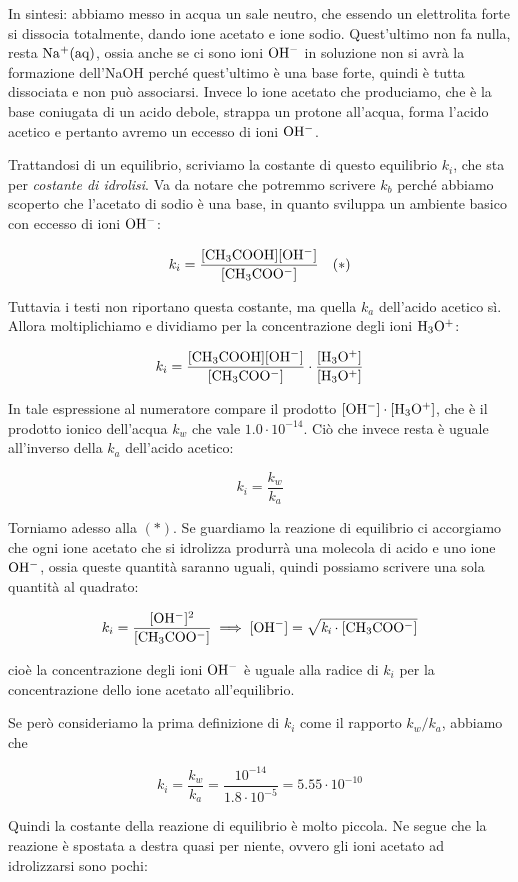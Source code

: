 In sintesi: abbiamo messo in acqua un sale neutro, che essendo un elettrolita forte si dissocia totalmente, dando ione acetato e ione sodio. Quest'ultimo non fa nulla, resta $\rm Na^+(aq)$, ossia anche se ci sono ioni $\rm OH^-$ in soluzione non si avrà la formazione dell'NaOH perché quest'ultimo è una base forte, quindi è tutta dissociata e non può associarsi. Invece lo ione acetato che produciamo, che è la base coniugata di un acido debole, strappa un protone all'acqua, forma l'acido acetico e pertanto avremo un eccesso di ioni $\rm OH^-$.

Trattandosi di un equilibrio, scriviamo la costante di questo equilibrio $k_i$, che sta per \textit{costante di idrolisi}. Va da notare che potremmo scrivere $k_b$ perché abbiamo scoperto che l'acetato di sodio è una base, in quanto sviluppa un ambiente basico con eccesso di ioni $\rm OH^-$:

$$k_i = \rm{\frac{[CH_3COOH] [OH^-]}{[CH_3COO^-]}} \quad (*)$$

Tuttavia i testi non riportano questa costante, ma quella $k_a$ dell'acido acetico sì. Allora moltiplichiamo e dividiamo per la concentrazione degli ioni $\rm H_3O^+$:

$$k_i = \rm{\frac{[CH_3COOH] [OH^-]}{[CH_3COO^-]} \cdot \frac{[H_3O^+]}{[H_3O^+]}}$$

In tale espressione al numeratore compare il prodotto $\rm [OH^-] \cdot [H_3O^+]$, che è il prodotto ionico dell'acqua $k_w$ che vale $1.0 \cdot 10^{-14}$. Ciò che invece resta è uguale all'inverso della $k_a$ dell'acido acetico:

$$k_i = \frac{k_w}{k_a}$$

Torniamo adesso alla $(*)$. Se guardiamo la reazione di equilibrio ci accorgiamo che ogni ione acetato che si idrolizza produrrà una molecola di acido e uno ione $\rm OH^-$, ossia queste quantità saranno uguali, quindi possiamo scrivere una sola quantità al quadrato:

$$k_i = \rm{\frac{[OH^-]^2}{[CH_3COO^-]}} \implies [OH^-]= \sqrt{\textit{k}_\textit{i} \cdot [CH_3COO^-]}$$

cioè la concentrazione degli ioni $\rm OH^-$ è uguale alla radice di $k_i$ per la concentrazione dello ione acetato all'equilibrio.

Se però consideriamo la prima definizione di $k_i$ come il rapporto $k_w/k_a$, abbiamo che

$$k_i = \frac{k_w}{k_a} = \frac{10^{-14}}{1.8 \cdot 10^{-5}}=5.55 \cdot 10^{-10}$$

Quindi la costante della reazione di equilibrio è molto piccola. Ne segue che la reazione è spostata a destra quasi per niente, ovvero gli ioni acetato ad idrolizzarsi sono pochi:

